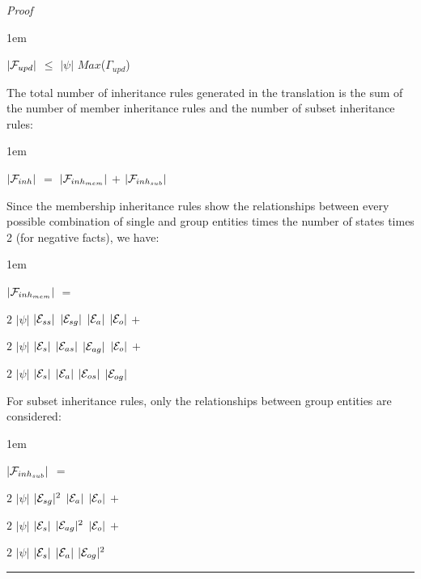 \documentclass[11pt]{report}
\newenvironment{vproof}
{
  \noindent
  {\em Proof}\hspace{0.5em}
}
{

  \noindent
  \rule{0.5em}{0.5em}
}
\newenvironment{vquote}
{
  \begin{list}{}{\leftmargin 1em}\item[]
}
{
  \end{list}
}
\begin{document}
\begin{vproof}
          \begin{vquote}
            $|{\cal F}_{upd}|$ $\leq$ $|\psi|$ $Max$($\Gamma_{upd}$)
          \end{vquote}

          The total number of inheritance rules generated in the translation
          is the sum of the number of member inheritance rules and the number
          of subset inheritance rules:

          \begin{vquote}
            $|{\cal F}_{inh}|$ $=$
              $|{\cal F}_{inh_{mem}}|$ $+$
              $|{\cal F}_{inh_{sub}}|$
          \end{vquote}

          Since the membership inheritance rules show the relationships
          between every possible combination of single and group entities
          times the number of states times 2 (for negative facts), we have:

          \begin{vquote}
            $|{\cal F}_{inh_{mem}}|$ $=$

            \hspace{1em}
            $2$ $|\psi|$ $|{\cal E}_{ss}|$ $|{\cal E}_{sg}|$ $|{\cal E}_{a}|$ $|{\cal E}_{o}|$ $+$

            \hspace{1em}
            $2$ $|\psi|$ $|{\cal E}_{s}|$ $|{\cal E}_{as}|$ $|{\cal E}_{ag}|$ $|{\cal E}_{o}|$ $+$

            \hspace{1em}
            $2$ $|\psi|$ $|{\cal E}_{s}|$ $|{\cal E}_{a}|$ $|{\cal E}_{os}|$ $|{\cal E}_{og}|$
          \end{vquote}

          For subset inheritance rules, only the relationships between group
          entities are considered:

          \begin{vquote}
            $|{\cal F}_{inh_{sub}}|$ $=$

            \hspace{1em}
            $2$ $|\psi|$ $|{\cal E}_{sg}|^{2}$ $|{\cal E}_{a}|$ $|{\cal E}_{o}|$ $+$

            \hspace{1em}
            $2$ $|\psi|$ $|{\cal E}_{s}|$ $|{\cal E}_{ag}|^{2}$ $|{\cal E}_{o}|$ $+$

            \hspace{1em}
            $2$ $|\psi|$ $|{\cal E}_{s}|$ $|{\cal E}_{a}|$ $|{\cal E}_{og}|^{2}$
          \end{vquote}


\end{vproof}
\end{document}
